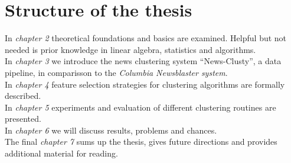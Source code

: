 \section{Structure of the thesis}
  In \emph{chapter 2} theoretical foundations and basics are examined. Helpful but not needed is prior knowledge in linear algebra, statistics and algorithms.\\
  In \emph{chapter 3} we introduce the news clustering system ``News-Clusty'', a data pipeline, in comparisson to the \emph{Columbia Newsblaster system}.\\
  In \emph{chapter 4} feature selection strategies for clustering algorithms are formally described.\\
  In \emph{chapter 5} experiments and evaluation of different clustering routines are presented.\\
  In \emph{chapter 6} we will discuss results, problems and chances.\\
  The final \emph{chapter 7} sums up the thesis, gives future directions and provides additional material for reading.

